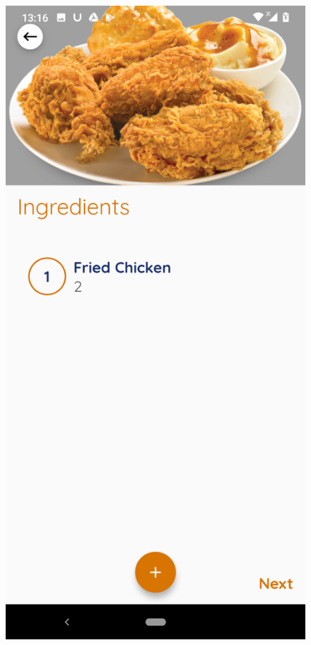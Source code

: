 \documentclass{article}
\begin{document}
\begin{figure}[h!]
    \includegraphics[scale=0.1]{Images/friechick_ingre.jpg}

\end{figure}
\end{document}
